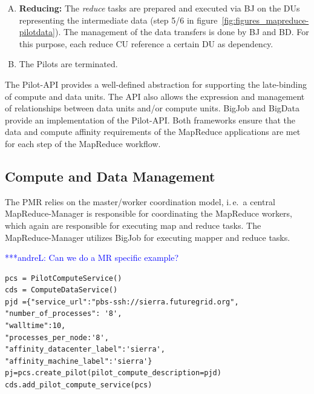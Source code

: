 \documentclass{acm_proc_article-sp}
\newcommand{\alnote}[1]{ {\textcolor{blue} { ***andreL: #1 }}}
\newcommand{\alnote}[1]{}
\newcommand{\pilots}{Pilots\xspace}
\begin{document}
\begin{enumerate}[A.]
		
	
	\item \textbf{Reducing:} The {\it reduce} tasks are prepared and 
	executed via BJ on the DUs representing the intermediate data (step 5/6 in 
	figure~\ref{fig:figures_mapreduce-pilotdata}). 
	The management of the data transfers is done by BJ and BD. For this purpose, 
	each reduce CU reference a certain DU as dependency.
	
	\item The \pilots are terminated.

\end{enumerate}

The Pilot-API provides a well-defined abstraction for supporting the
late-binding of compute and data units. The API also allows the expression and
management of relationships between data units and/or compute units. BigJob
and BigData provide an implementation of the Pilot-API. Both frameworks ensure
that the data and compute affinity requirements of the MapReduce applications
are met for each step of the MapReduce workflow.

\subsection{Compute and Data Management}
The PMR relies on the master/worker
coordination model, i.\,e.\ a central MapReduce-Manager is responsible for
coordinating the MapReduce workers, which again are responsible for executing
map and reduce tasks. The MapReduce-Manager utilizes BigJob for executing
mapper and reduce tasks. 

\alnote{Can we do a MR specific example?}

\lstset{
language=Python,
frame=single,
captionpos=b,
stringstyle=\ttfamily,
basicstyle=\scriptsize\ttfamily
}
\noindent\begin{minipage}{0.47 \textwidth}
\begin{lstlisting}[caption={\textbf{Pilot Compute Creation:} Instantiation of a Pilot Job using Pilot Compute Description}, label={lst:pcs_creation}]
pcs = PilotComputeService()
cds = ComputeDataService()
pjd ={"service_url":"pbs-ssh://sierra.futuregrid.org", 
"number_of_processes": '8',
"walltime":10, 
"processes_per_node:'8',
"affinity_datacenter_label":'sierra',
"affinity_machine_label":'sierra'}
pj=pcs.create_pilot(pilot_compute_description=pjd)
cds.add_pilot_compute_service(pcs)
\end{lstlisting}
\end{minipage}
\end{document}
